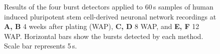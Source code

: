 \documentclass[12pt, titlepage]{article}
\renewcommand{\baselinestretch}{1.66}
\begin{document}
		\begin{figure}[h]
			\centering
			\caption{Results of the four burst detectors applied to 60$\,$s samples of human induced pluripotent stem cell-derived neuronal network recordings at \textbf{A, B} 4 weeks after plating (WAP), \textbf{C, D} 8 WAP, and \textbf{E, F} 12 WAP. Horizontal bars show the bursts detected by each method. Scale bar represents 5$\,$s.}
			\label{hiPSN_examples}
		\end{figure} 
		\renewcommand{\baselinestretch}{1.66}\normalsize
\end{document}
